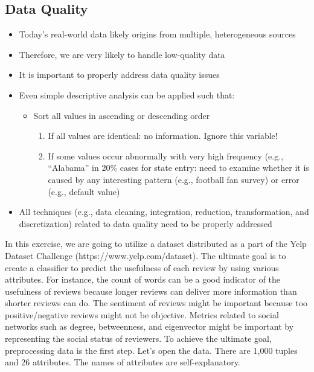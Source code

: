 \documentclass[
  letterpaper,
]{scrbook}
\providecommand{\tightlist}{%
  \setlength{\itemsep}{0pt}\setlength{\parskip}{0pt}}
\begin{document}
\subsection*{Data Quality}\label{data-quality}

\begin{itemize}
\tightlist
\item
  Today's real-world data likely origins from multiple, heterogeneous
  sources
\item
  Therefore, we are very likely to handle low-quality data
\item
  It is important to properly address data quality issues
\item
  Even simple descriptive analysis can be applied such that:

  \begin{itemize}
  \tightlist
  \item
    Sort all values in ascending or descending order

    \begin{enumerate}
    \def\labelenumi{\arabic{enumi}.}
    \tightlist
    \item
      If all values are identical: no information. Ignore this variable!
    \item
      If some values occur abnormally with very high frequency (e.g.,
      ``Alabama'' in 20\% cases for state entry: need to examine whether
      it is caused by any interesting pattern (e.g., football fan
      survey) or error (e.g., default value)
    \end{enumerate}
  \end{itemize}
\item
  All techniques (e.g., data cleaning, integration, reduction,
  transformation, and discretization) related to data quality need to be
  properly addressed
\end{itemize}

In this exercise, we are going to utilize a dataset distributed as a
part of the Yelp Dataset Challenge (https://www.yelp.com/dataset). The
ultimate goal is to create a classifier to predict the usefulness of
each review by using various attributes. For instance, the count of
words can be a good indicator of the usefulness of reviews because
longer reviews can deliver more information than shorter reviews can do.
The sentiment of reviews might be important because too
positive/negative reviews might not be objective. Metrics related to
social networks such as degree, betweenness, and eigenvector might be
important by representing the social status of reviewers. To achieve the
ultimate goal, preprocessing data is the first step. Let's open the
data. There are 1,000 tuples and 26 attributes. The names of attributes
are self-explanatory.
\end{document}
